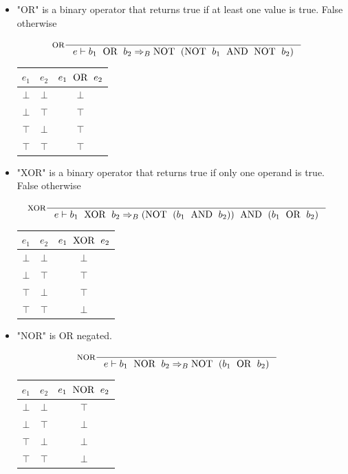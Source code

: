 \begin{itemize}
\item "OR" is a binary operator that returns true if at least one value is true. False otherwise

\begin{align*}
&\inference[OR]{}
                 {e \vdash b_1 \Tor b_2 \Rightarrow_B \Tnot(\Tnot b_1 \Tand \Tnot b_2)}
\end{align*}

\begin{center}
\begin{tabular}{ | c | c | c | }
\hline
$e_1$ & $e_2$ & $e_1 \text{\; OR \;} e_2$ \\\hline
$\bot$ & $\bot$ & $\bot$ \\\hline
$\bot$ & $\top$ & $\top$ \\\hline
$\top$ & $\bot$ & $\top$ \\\hline
$\top$ & $\top$ & $\top$ \\\hline
\end{tabular}
\end{center}

\item "XOR" is a binary operator that returns true if only one operand is true. False otherwise

\begin{align*}
&\inference[XOR]{}
                  {e \vdash b_1 \Txor b_2 \Rightarrow_B (\Tnot(b_1 \Tand b_2)) \Tand (b_1 \Tor b_2)}
\end{align*}

\begin{center}
\begin{tabular}{ | c | c | c | }
\hline
$e_1$ & $e_2$ & $e_1 \text{\; XOR \;} e_2$ \\\hline
$\bot$ & $\bot$ & $\bot$ \\\hline
$\bot$ & $\top$ & $\top$ \\\hline
$\top$ & $\bot$ & $\top$ \\\hline
$\top$ & $\top$ & $\bot$ \\\hline
\end{tabular}
\end{center}

\item "NOR" is OR negated.

\begin{align*}
&\inference[NOR]{}
                   {e \vdash b_1 \Tnor b_2 \Rightarrow_B \Tnot( b_1 \Tor b_2 )}
\end{align*}

\begin{center}
\begin{tabular}{ | c | c | c | }
\hline
$e_1$ & $e_2$ & $e_1 \text{\; NOR \;} e_2$ \\\hline
$\bot$ & $\bot$ & $\top$ \\\hline
$\bot$ & $\top$ & $\bot$ \\\hline
$\top$ & $\bot$ & $\bot$ \\\hline
$\top$ & $\top$ & $\bot$ \\\hline
\end{tabular}
\end{center}


\end{itemize}

